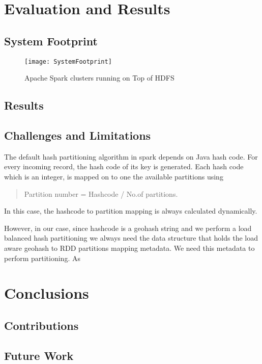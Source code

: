 \documentclass[article,type=msc,colorback,12pt,accentcolor=tud1d]{tudthesis}
\begin{document}
  \cleardoublepage
  
  \hfill
  \section{Evaluation and Results}
  \hfill
  		  \subsection{System Footprint}
		  
				\begin{figure}[h]
				\centering
				\texttt{[image: SystemFootprint]}
				\caption{Apache Spark clusters running on Top of HDFS}
				\label{fig:system-footprint}
				\end{figure}
		  
		  \subsection{Results}
		  \hfill
		  \subsection{Challenges and Limitations}
		  \par The default hash partitioning algorithm in spark depends on Java hash code. For every incoming record, the hash code of its key is generated. Each hash code which is an integer, is mapped on to one the available partitions using 
		  \begin{quote}
		  	Partition number = Hashcode / No.of partitions. 
		  \end{quote}
		  In this case, the hashcode to partition mapping is always calculated dynamically.
		  
		  However, in our case, since hashcode is a geohash string and we perform a load balanced hash partitioning we always need the data structure that holds the load aware geohash to RDD partitions mapping metadata. We need this metadata to perform partitioning. As
		  
  \cleardoublepage
  
  \hfill
  \section{Conclusions}
  \hfill
		   \subsection{Contributions}
	   	   \subsection{Future Work}
	   	   
\end{document}
